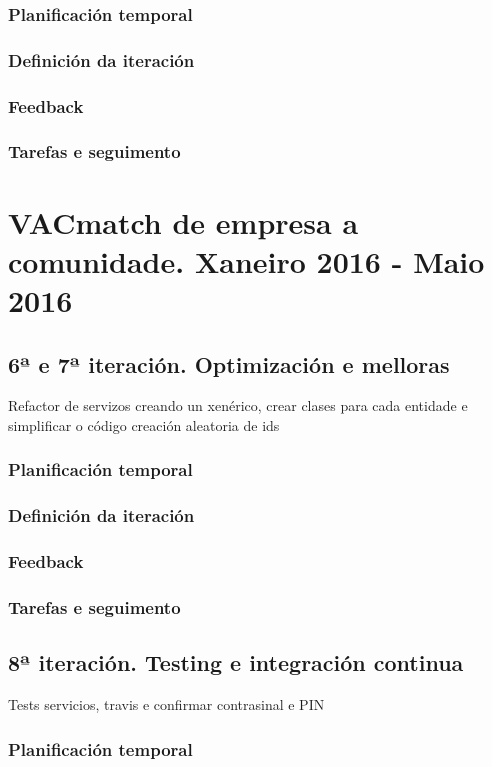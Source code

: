       \subsubsection{Planificación temporal}
      \subsubsection{Definición da iteración}
      \subsubsection{Feedback}
      \subsubsection{Tarefas e seguimento}


  \section{VACmatch de empresa a comunidade. Xaneiro 2016 - Maio 2016}
    \subsection{6ª e 7ª iteración. Optimización e melloras}
    Refactor de servizos creando un xenérico, crear clases para cada entidade e simplificar o código
    creación aleatoria de ids
      \subsubsection{Planificación temporal}
      \subsubsection{Definición da iteración}
      \subsubsection{Feedback}
      \subsubsection{Tarefas e seguimento}

    \subsection{8ª iteración. Testing e integración continua}
    Tests servicios, travis e confirmar contrasinal e PIN
      \subsubsection{Planificación temporal}
